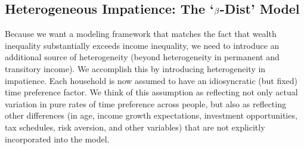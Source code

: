 \documentclass[12pt,titlepage]{econtex}
\begin{document}

\subsection{Heterogeneous Impatience: The `$\beta$-Dist' Model}

Because we want a modeling framework that matches the fact
that wealth inequality substantially exceeds income inequality, we
need to introduce an additional source of heterogeneity (beyond heterogeneity in permanent and transitory income).  We accomplish this
by introducing heterogeneity in impatience.  Each household is now assumed to
have an idiosyncratic (but fixed) time preference factor.  We think of
this assumption as reflecting not only actual variation in pure rates
of time preference across people, but also as reflecting other
differences (in age, income growth expectations, investment
opportunities, tax schedules, risk aversion, and other variables) that
are not explicitly incorporated into the model.
\end{document}
